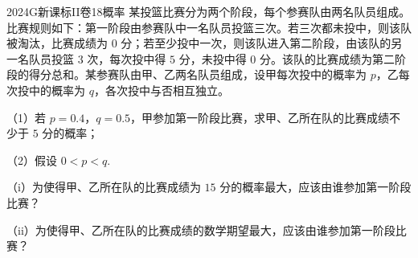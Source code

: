 
\begin{problem}{2024}{G}{新课标II卷}{18}{概率}
某投篮比赛分为两个阶段，每个参赛队由两名队员组成。比赛规则如下：第一阶段由参赛队中一名队员投篮三次。若三次都未投中，则该队被淘汰，比赛成绩为 $0$ 分；若至少投中一次，则该队进入第二阶段，由该队的另一名队员投篮 $3$ 次，每次投中得 $5$ 分，未投中得 $0$ 分。该队的比赛成绩为第二阶段的得分总和。某参赛队由甲、乙两名队员组成，设甲每次投中的概率为 $p$，乙每次投中的概率为 $q$，各次投中与否相互独立。

（1）若 $p=0.4$，$q=0.5$，甲参加第一阶段比赛，求甲、乙所在队的比赛成绩不少于 $5$ 分的概率；

（2）假设 $0<p<q$.

（i）为使得甲、乙所在队的比赛成绩为 $15$ 分的概率最大，应该由谁参加第一阶段比赛？

（ii）为使得甲、乙所在队的比赛成绩的数学期望最大，应该由谁参加第一阶段比赛？
\end{problem}